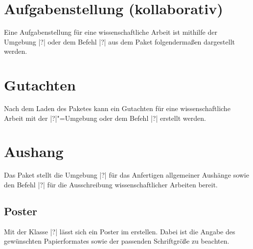 \begin{Bundle}{}
\section{Aufgabenstellung (kollaborativ)}
%
%
%
%
Eine Aufgabenstellung für eine wissenschaftliche Arbeit ist mithilfe der 
Umgebung |?| oder dem Befehl |?| aus dem 
Paket  folgendermaßen dargestellt werden.

\section{Gutachten}
%
%
%
Nach dem Laden des Paketes  kann ein Gutachten für 
eine wissenschaftliche Arbeit mit der |?|"=Umgebung 
oder dem Befehl |?| erstellt werden.

\section{Aushang}
%
%
%
Das Paket  stellt die Umgebung |?|
für das Anfertigen allgemeiner Aushänge sowie den Befehl |?|
für die Ausschreibung wissenschaftlicher Arbeiten bereit.
\end{Bundle}

\begin{Bundle}{}
\section{Poster}
%
%
%
Mit der Klasse |?| lässt sich ein Poster im \TUDCD 
erstellen. Dabei ist die Angabe des gewünschten Papierformates sowie der 
passenden Schriftgröße zu beachten. 
%
\end{Bundle}


